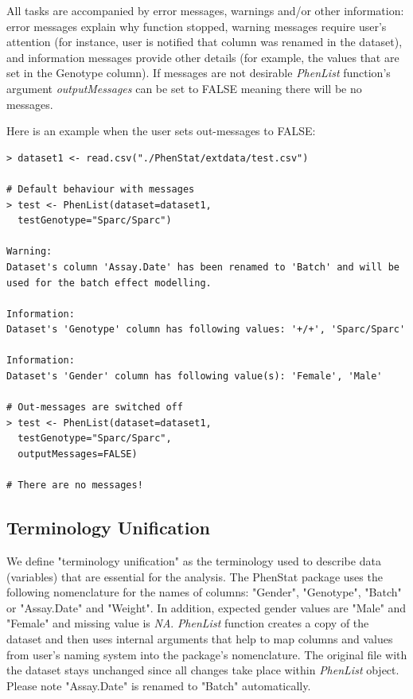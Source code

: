 \documentclass[12pt,a4paper]{article}
\begin{document}
All tasks are accompanied by error messages, warnings and/or other information: error messages explain why function stopped, 
warning messages require user's attention (for instance, user is notified that column was renamed in the dataset), and information messages provide other details (for example, the values that are set in the Genotype column). 
If messages are not desirable \textit{PhenList} function's argument \textit{outputMessages} can be set to FALSE meaning there will be no messages.

Here is an example when the user sets out-messages to FALSE: 

\begingroup
    \fontsize{8pt}{12pt}\selectfont
\begin{verbatim}
> dataset1 <- read.csv("./PhenStat/extdata/test.csv")

# Default behaviour with messages
> test <- PhenList(dataset=dataset1,
  testGenotype="Sparc/Sparc")

Warning:
Dataset's column 'Assay.Date' has been renamed to 'Batch' and will be used for the batch effect modelling.

Information:
Dataset's 'Genotype' column has following values: '+/+', 'Sparc/Sparc'

Information:
Dataset's 'Gender' column has following value(s): 'Female', 'Male'

# Out-messages are switched off 
> test <- PhenList(dataset=dataset1,
  testGenotype="Sparc/Sparc",
  outputMessages=FALSE)
  
# There are no messages!
\end{verbatim}
\endgroup

\subsection{Terminology Unification}
\label{TerminilogyUnification}
We define "terminology unification" as the terminology used to describe data (variables) that are essential for the analysis. The PhenStat package uses the following nomenclature for the names of columns: "Gender", "Genotype", "Batch" or "Assay.Date" and "Weight". In addition, expected gender values are "Male" and "Female" and missing value is \textit{NA}. 
\textit{PhenList} function creates a copy of the dataset and then uses internal arguments that help to map columns and values from user's naming system into the package's nomenclature. 
The original file with the dataset stays unchanged since all changes take place within \textit{PhenList} object. Please note "Assay.Date" is renamed to "Batch" automatically.
\end{document}
